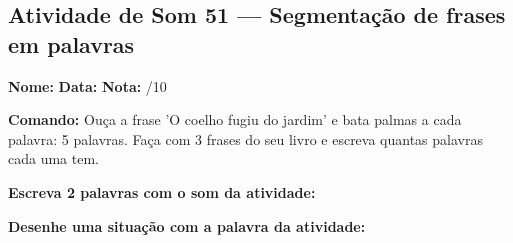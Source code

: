 \subsection{Atividade de Som 51 --- Segmentação de frases em palavras}
\begin{exercicio}



\noindent\textbf{Nome:} \underline{\hspace{3.2cm}} \quad \textbf{Data:} \underline{\hspace{1.6cm}} \quad \textbf{Nota:} \underline{\hspace{0.9cm}}/10


\noindent\textbf{Comando:} Ouça a frase 'O coelho fugiu do jardim' e bata palmas a cada palavra: 5 palavras. Faça com 3 frases do seu livro e escreva quantas palavras cada uma tem.


\begin{center}
\end{center}

\noindent\textbf{Escreva 2 palavras com o som da atividade:}

\begin{center}
  \underline{\hspace{3cm}} \quad \underline{\hspace{3cm}}
\end{center}

\noindent\textbf{Desenhe uma situação com a palavra da atividade:}

\begin{center}
\end{center}

\end{exercicio}



